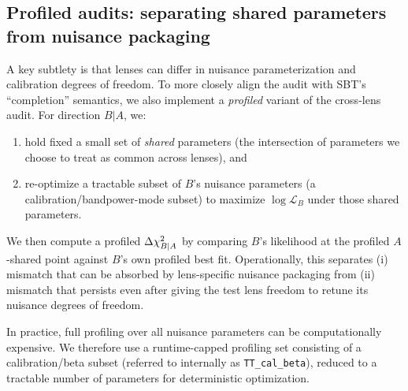 \subsection{Profiled audits: separating shared parameters from nuisance packaging}
\label{sec:profiled-audit}

A key subtlety is that lenses can differ in nuisance parameterization and calibration degrees of freedom. To more closely align the audit with SBT's ``completion'' semantics, we also implement a \emph{profiled} variant of the cross-lens audit. For direction $B|A$, we:
\begin{enumerate}[leftmargin=*, itemsep=2pt]
  \item hold fixed a small set of \emph{shared} parameters (the intersection of parameters we choose to treat as common across lenses), and
  \item re-optimize a tractable subset of $B$'s nuisance parameters (a calibration/bandpower-mode subset) to maximize $\log \mathcal{L}_B$ under those shared parameters.
\end{enumerate}
We then compute a profiled $\Delta \chi^2_{B|A}$ by comparing $B$'s likelihood at the profiled $A$-shared point against $B$'s own profiled best fit. Operationally, this separates (i) mismatch that can be absorbed by lens-specific nuisance packaging from (ii) mismatch that persists even after giving the test lens freedom to retune its nuisance degrees of freedom.

In practice, full profiling over all nuisance parameters can be computationally expensive. We therefore use a runtime-capped profiling set consisting of a calibration/beta subset (referred to internally as \texttt{TT\_cal\_beta}), reduced to a tractable number of parameters for deterministic optimization.
